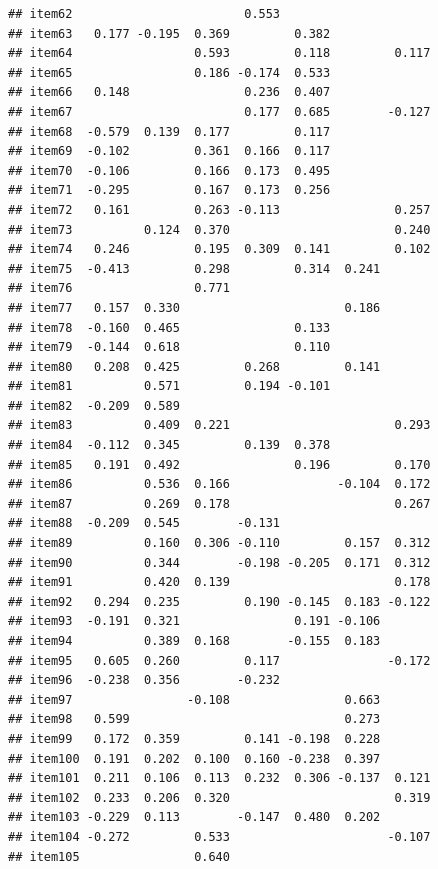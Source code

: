 \documentclass[
  english,
  man]{apa6}
\begin{document}
\begin{verbatim}
## item62                        0.553                     
## item63   0.177 -0.195  0.369         0.382              
## item64                 0.593         0.118         0.117
## item65                 0.186 -0.174  0.533              
## item66   0.148                0.236  0.407              
## item67                        0.177  0.685        -0.127
## item68  -0.579  0.139  0.177         0.117              
## item69  -0.102         0.361  0.166  0.117              
## item70  -0.106         0.166  0.173  0.495              
## item71  -0.295         0.167  0.173  0.256              
## item72   0.161         0.263 -0.113                0.257
## item73          0.124  0.370                       0.240
## item74   0.246         0.195  0.309  0.141         0.102
## item75  -0.413         0.298         0.314  0.241       
## item76                 0.771                            
## item77   0.157  0.330                       0.186       
## item78  -0.160  0.465                0.133              
## item79  -0.144  0.618                0.110              
## item80   0.208  0.425         0.268         0.141       
## item81          0.571         0.194 -0.101              
## item82  -0.209  0.589                                   
## item83          0.409  0.221                       0.293
## item84  -0.112  0.345         0.139  0.378              
## item85   0.191  0.492                0.196         0.170
## item86          0.536  0.166               -0.104  0.172
## item87          0.269  0.178                       0.267
## item88  -0.209  0.545        -0.131                     
## item89          0.160  0.306 -0.110         0.157  0.312
## item90          0.344        -0.198 -0.205  0.171  0.312
## item91          0.420  0.139                       0.178
## item92   0.294  0.235         0.190 -0.145  0.183 -0.122
## item93  -0.191  0.321                0.191 -0.106       
## item94          0.389  0.168        -0.155  0.183       
## item95   0.605  0.260         0.117               -0.172
## item96  -0.238  0.356        -0.232                     
## item97                -0.108                0.663       
## item98   0.599                              0.273       
## item99   0.172  0.359         0.141 -0.198  0.228       
## item100  0.191  0.202  0.100  0.160 -0.238  0.397       
## item101  0.211  0.106  0.113  0.232  0.306 -0.137  0.121
## item102  0.233  0.206  0.320                       0.319
## item103 -0.229  0.113        -0.147  0.480  0.202       
## item104 -0.272         0.533                      -0.107
## item105                0.640                            

\end{verbatim}
\end{document}

